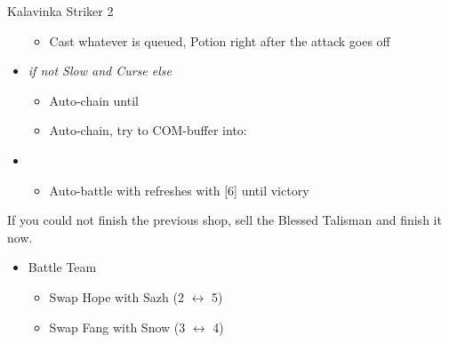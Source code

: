 \begin{multicols}{2}
\begin{battle}{Kalavinka Striker 2}
\begin{itemize}
\begin{itemize}
              \item Cast whatever is queued, Potion right after the attack goes off
            \end{itemize}
      \item \second \textit{ if not Slow and Curse else} \fourth
            \begin{itemize}
              \item Auto-chain until \stagger
              \item Auto-chain, try to COM-buffer into:
            \end{itemize}
      \item \fifth
            \begin{itemize}
              \item Auto-battle with refreshes with [6] until victory
            \end{itemize}
    \end{itemize}
  \end{battle}
  If you could not finish the previous shop, sell the Blessed Talisman and finish it now.
  \vfill
  \renewcommand{\first}{[1] Strike Team (\com/\syn/\com)}
  \renewcommand{\second}{[2] Tri-Disaster (\rav/\rav/\rav)}
  \renewcommand{\third}{[3] Protection (\med/\syn/\sen)}
  \renewcommand{\fourth}{[4] Tri-Disaster (\rav/\rav/\rav)}
  \renewcommand{\fifth}{[5] Cerberus (\com/\com/\com)}
  \renewcommand{\sixth}{[6] Cerberus (\com/\com/\com)}
  \begin{menu}
    \begin{itemize}
      \paradigm
      \begin{itemize}
        \item Battle Team
              \begin{itemize}
                \item Swap Hope with Sazh (2 $\leftrightarrow$ 5)
                \item Swap Fang with Snow (3 $\leftrightarrow$ 4)
              \end{itemize}
              {\paradigmline[1]{\textit{\com}}{\textit{\syn}}{\textit{(\com)}}}%
              {\paradigmline{(\rav)}{\rav}{\rav}}%
              {\paradigmline{\med}{\syn}{\sen}}%
              {\paradigmline{[\rav]}{(\rav)}{(\rav)}}%
              {\paradigmline{\com}{[\com]}{\com}}%
              {\paradigmline{\com}{[\com]}{\com}}
      \end{itemize}
      \crystarium

\end{itemize}
\end{menu}
\end{multicols}
